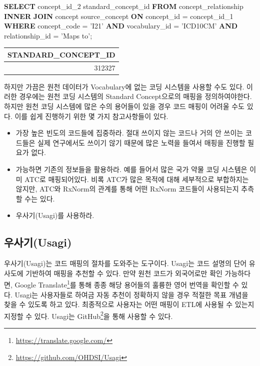 \documentclass[11pt]{book}
\newenvironment{Shaded}{\begin{snugshade}}{\end{snugshade}}
\newcommand{\KeywordTok}[1]{\textcolor[rgb]{0.13,0.29,0.53}{\textbf{#1}}}
\newcommand{\DecValTok}[1]{\textcolor[rgb]{0.00,0.00,0.81}{#1}}
\newcommand{\StringTok}[1]{\textcolor[rgb]{0.31,0.60,0.02}{#1}}
\newcommand{\NormalTok}[1]{#1}
\providecommand{\tightlist}{%
  \setlength{\itemsep}{0pt}\setlength{\parskip}{0pt}}
\let\rmarkdownfootnote\footnote%
\def\footnote{\protect\rmarkdownfootnote}
\theoremstyle{definition}
\theoremstyle{definition}
\theoremstyle{definition}
\theoremstyle{remark}
\begin{document}
\begin{Shaded}
\begin{Highlighting}[]
\KeywordTok{SELECT}\NormalTok{ concept_id_2 standard_concept_id}
\KeywordTok{FROM}\NormalTok{ concept_relationship}
\KeywordTok{INNER} \KeywordTok{JOIN}\NormalTok{ concept source_concept}
  \KeywordTok{ON}\NormalTok{ concept_id = concept_id_}\DecValTok{1}
\KeywordTok{WHERE}\NormalTok{ concept_code = }\StringTok{'I21'}
  \KeywordTok{AND}\NormalTok{ vocabulary_id = }\StringTok{'ICD10CM'}
  \KeywordTok{AND}\NormalTok{ relationship_id = }\StringTok{'Maps to'}\NormalTok{; }
\end{Highlighting}
\end{Shaded}

\begin{longtable}[]{@{}r@{}}
\toprule
STANDARD\_CONCEPT\_ID\tabularnewline
\midrule
\endhead
312327\tabularnewline
\bottomrule
\end{longtable}

하지만 가끔은 원천 데이터가 Vocabulary에 없는 코딩 시스템을 사용할 수도
있다. 이러한 경우에는 원천 코딩 시스템의 Standard Concept으로의 매핑을
정의하여야한다. 하지만 원천 코딩 시스템에 많은 수의 용어들이 있을 경우
코드 매핑이 어려울 수도 있다. 이를 쉽게 진행하기 위한 몇 가지
참고사항들이 있다.

\begin{itemize}
\tightlist
\item
  가장 높은 빈도의 코드들에 집중하라. 절대 쓰이지 않는 코드나 거의 안
  쓰이는 코드들은 실제 연구에서도 쓰이기 않기 때문에 많은 노력을 들여서
  매핑을 진행할 필요가 없다.
\item
  가능하면 기존의 정보들을 활용하라. 예를 들어서 많은 국가 약물 코딩
  시스템은 이미 ATC로 매핑되어있다. 비록 ATC가 많은 목적에 대해
  세부적으로 부합하지는 않지만, ATC와 RxNorm의 관계를 통해 어떤 RxNorm
  코드들이 사용되는지 추측할 수는 있다.
\item
  우사기(Usagi)를 사용하라.
\end{itemize}

\subsection{우사기(Usagi)}\label{usagi}

우사기(Usagi)는 코드 매핑의 절차를 도와주는 도구이다. Usagi는 코드
설명의 단어 유사도에 기반하여 매핑을 추천할 수 있다. 만약 원천 코드가
외국어로만 확인 가능하다면, Google Translate\footnote{\url{https://translate.google.com/}}를
통해 종종 해당 용어들의 훌륭한 영어 번역을 확인할 수 있다. Usagi는
사용자들로 하여금 자동 추천이 정확하지 않을 경우 적절한 목표 개념을 찾을
수 있도록 하고 있다. 최종적으로 사용자는 어떤 매핑이 ETL에 사용될 수
있는지 지정할 수 있다. Usagi는 GitHub\footnote{\url{https://github.com/OHDSI/Usagi}}을
통해 사용할 수 있다. 
\end{document}
